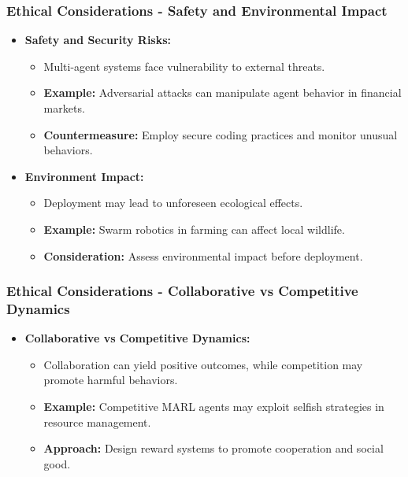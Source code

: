 \documentclass[aspectratio=169]{beamer}
\begin{document}
\begin{frame}[fragile]
    \frametitle{Ethical Considerations - Safety and Environmental Impact}
    \begin{itemize}
        \item \textbf{Safety and Security Risks:}
        \begin{itemize}
            \item Multi-agent systems face vulnerability to external threats.
            \item \textbf{Example:} Adversarial attacks can manipulate agent behavior in financial markets.
            \item \textbf{Countermeasure:} Employ secure coding practices and monitor unusual behaviors.
        \end{itemize}
        
        \item \textbf{Environment Impact:}
        \begin{itemize}
            \item Deployment may lead to unforeseen ecological effects.
            \item \textbf{Example:} Swarm robotics in farming can affect local wildlife.
            \item \textbf{Consideration:} Assess environmental impact before deployment.
        \end{itemize}
    \end{itemize}
\end{frame}

\begin{frame}[fragile]
    \frametitle{Ethical Considerations - Collaborative vs Competitive Dynamics}
    \begin{itemize}
        \item \textbf{Collaborative vs Competitive Dynamics:}
        \begin{itemize}
            \item Collaboration can yield positive outcomes, while competition may promote harmful behaviors.
            \item \textbf{Example:} Competitive MARL agents may exploit selfish strategies in resource management.
            \item \textbf{Approach:} Design reward systems to promote cooperation and social good.
        \end{itemize}
    \end{itemize}
\end{frame}
\end{document}

